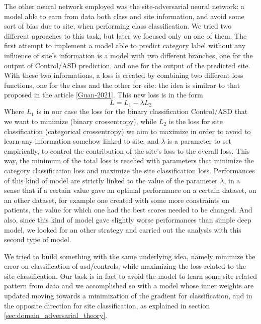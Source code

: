 \documentclass[11pt]{report}
\begin{document}
The other neural network employed was the site-adversarial neural network: a model able to earn from data both class and site information, and avoid some sort of bias due to site, when performing class classification.
We tried two different aproaches to this task, but later we focused only on one of them.
The first attempt to implement a model able to predict category label without any influence of site's information is a model with two different branches, one for the output of Control/ASD prediction, and one for the output of the predicted site.
With these two informations, a loss is created by combining two different loss functions, one for the class and the other for site: the idea is similrar to that proposed in the article \ref{Guan-2021}.
This new loss is in the form
\begin{equation}
L = L_1 - \lambda L_2
\end{equation}
Where $L_1$  is in our case the loss for the binary classification Control/ASD that we want to minimize (binary crossentropy), while $L_2$ is the loss for site classification (categorical crossentropy) we aim to maximize in order to avoid to learn any information somehow linked to site, and $\lambda $ is a parameter to set empirically, to control the contribution of the site's loss to the overall loss.
This way, the minimum of the total loss is reached with parameters that minimize the category classification loss and maximize the site classification loss.
Performances of this kind of model are strictly linked to the value of the parameter $\lambda$, in a sense that if a certain value gave an optimal performance on a certain dataset, on an other dataset, for example one created with some more constraints on patients, the value for which one had the best scores needed to be changed.
And also, since this kind of model gave slightly worse performances than simple deep model, we looked for an other strategy and carried out the analysis with this second type of model.

We tried to build something with the same underlying idea, namely minimize the error on classification of asd/controls, while maximizing the loss related to the site classification.
Our task is in fact to avoid the model to learn some site-related pattern from data and we accomplished so with a model whose inner weights are updated moving towards a minimization of the gradient for classification, and in the opposite direction for site classification, as explained in section \ref{sec:domain_adversarial_theory}.
\end{document}
